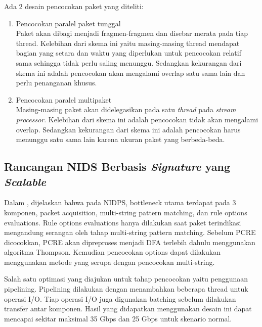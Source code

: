     Ada 2 desain pencocokan paket yang diteliti:

    \begin{enumerate}

      \item Pencocokan paralel paket tunggal \\
      Paket akan dibagi menjadi fragmen-fragmen dan disebar merata pada tiap thread. Kelebihan dari skema ini yaitu masing-masing thread mendapat bagian yang setara dan waktu yang diperlukan untuk pencocokan relatif sama sehingga tidak perlu saling menunggu. Sedangkan kekurangan dari skema ini adalah pencocokan akan mengalami overlap satu sama lain dan perlu penanganan khusus.

      \item Pencocokan paralel multipaket \\
      Masing-masing paket akan didelegasikan pada satu \emph{thread} pada \emph{stream processor}. Kelebihan dari skema ini adalah pencocokan tidak akan mengalami overlap. Sedangkan kekurangan dari skema ini adalah pencocokan harus menunggu satu sama lain karena ukuran paket yang berbeda-beda.

    \end{enumerate}

  \subsection{Rancangan NIDS Berbasis \emph{Signature} yang \emph{Scalable}}

    Dalam \parencite{kargus2012}, dijelaskan bahwa pada NIDPS, bottleneck utama terdapat pada 3 komponen, packet acquisition, multi-string pattern matching, dan rule options evaluations. Rule options evaluations hanya dilakukan saat paket terindikasi mengandung serangan oleh tahap multi-string pattern matching. Sebelum PCRE dicocokkan, PCRE akan dipreproses menjadi DFA terlebih dahulu menggunakan algoritma Thompson. Kemudian pencocokan options dapat dilakukan menggunakan metode yang serupa dengan pencocokan multi-string.

    Salah satu optimasi yang diajukan untuk tahap pencocokan yaitu penggunaan pipelining. Pipelining dilakukan dengan menambahkan beberapa thread untuk operasi I/O. Tiap operasi I/O juga digunakan batching sebelum dilakukan transfer antar komponen. Hasil yang didapatkan menggunakan desain ini dapat mencapai sekitar maksimal 35 Gbps dan 25 Gbps untuk skenario normal.

